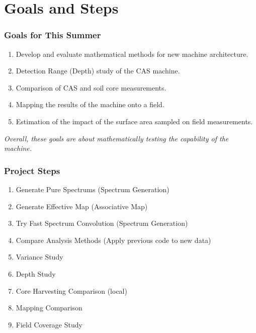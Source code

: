 \documentclass[notheorems,11pt,compress]{beamer}
\begin{document}
\section{Goals and Steps}

\begin{frame}
\frametitle{Goals for This Summer}
\begin{enumerate}
    \item Develop and evaluate mathematical methods for new machine architecture.
    \item Detection Range (Depth) study of the CAS machine.
    \item Comparison of CAS and soil core measurements.
    \item Mapping the results of the machine onto a field.
    \item Estimation of the impact of the surface area sampled on field measurements.
\end{enumerate}
\small
\textit{Overall, these goals are about mathematically testing the capability of the machine.}
\end{frame}

\begin{frame}
\frametitle{Project Steps}
\begin{enumerate}
    \item Generate Pure Spectrums (Spectrum Generation)
    \item Generate Effective Map (Associative Map)
    \item Try Fast Spectrum Convolution (Spectrum Generation)
    \item Compare Analysis Methods (Apply previous code to new data)
    \item Variance Study
    \item Depth Study
    \item Core Harvesting Comparison (local)
    \item Mapping Comparison
    \item Field Coverage Study
\end{enumerate}
\end{frame}
\end{document}
